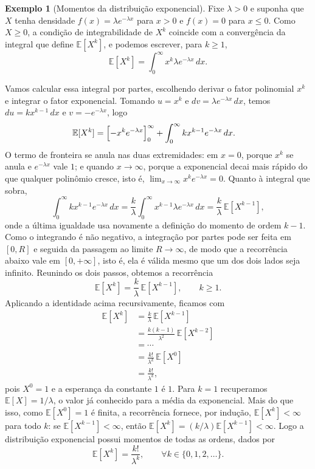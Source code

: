 \documentclass[12pt,portuguese]{article}
\theoremstyle{definition}
\newtheorem{example}[example]{Exemplo}
\theoremstyle{plainexercise}
\theoremstyle{starredexercise}
\theoremstyle{definition}
\begin{document}
\begin{example}[Momentos da distribuição exponencial]\label{ex:momento-exponencial}
Fixe $\lambda>0$ e suponha que $X$ tenha densidade
$f(x)=\lambda e^{-\lambda x}$ para $x>0$ e $f(x)=0$ para $x\leqslant 0$. Como
$X\geqslant 0$, a condição de integrabilidade de $X^k$ coincide com a convergência da
integral que define $\mathbb{E}[X^k]$, e podemos escrever, para $k\geqslant 1$,
\[
\mathbb{E}[X^k]=\int_0^{\infty}x^k\lambda e^{-\lambda x}\,dx .
\]

Vamos calcular essa integral por partes, escolhendo derivar o fator polinomial
$x^k$ e integrar o fator exponencial. Tomando $u=x^k$ e
$dv=\lambda e^{-\lambda x}\,dx$, temos $du=kx^{k-1}\,dx$ e
$v=-e^{-\lambda x}$, logo
\begin{align*}
\mathbb{E}[X^k]
&= \Bigl[-x^k e^{-\lambda x}\Bigr]_0^{\infty}
+ \int_0^{\infty}kx^{k-1}e^{-\lambda x}\,dx .
\end{align*}
O termo de fronteira se anula nas duas extremidades: em $x=0$, porque $x^k$ se
anula e $e^{-\lambda x}$ vale $1$; e quando $x\to\infty$, porque a exponencial decai
mais rápido do que qualquer polinômio cresce, isto é,
$\lim_{x\to\infty}x^k e^{-\lambda x}=0$. Quanto à integral que sobra,
\[
\int_0^{\infty}kx^{k-1}e^{-\lambda x}\,dx
= \frac{k}{\lambda}\int_0^{\infty}x^{k-1}\lambda e^{-\lambda x}\,dx
= \frac{k}{\lambda}\,\mathbb{E}[X^{k-1}],
\]
onde a última igualdade usa novamente a definição do momento de ordem $k-1$.
Como o integrando é não negativo, a integração por partes pode ser feita em
$[0,R]$ e seguida da passagem ao limite $R\to\infty$, de modo que a recorrência
abaixo vale em $[0,+\infty]$, isto é, ela é válida mesmo que um dos dois lados
seja infinito. Reunindo os dois passos, obtemos a recorrência
\[
\mathbb{E}[X^k]=\frac{k}{\lambda}\,\mathbb{E}[X^{k-1}],\qquad k\geqslant 1 .
\]
Aplicando a identidade acima recursivamente, ficamos com
\begin{align*}
\mathbb{E}[X^k]
&= \frac{k}{\lambda}\,\mathbb{E}[X^{k-1}] \\
&= \frac{k(k-1)}{\lambda^2}\,\mathbb{E}[X^{k-2}] \\
&= \cdots \\
&= \frac{k!}{\lambda^k}\,\mathbb{E}[X^0] \\
&= \frac{k!}{\lambda^k},
\end{align*}
pois $X^0=1$ e a esperança da constante $1$ é $1$. Para $k=1$ recuperamos
$\mathbb{E}[X]=1/\lambda$, o valor já conhecido para a média da exponencial.
Mais do que isso, como $\mathbb{E}[X^0]=1$ é finita, a recorrência fornece,
por indução, $\mathbb{E}[X^k]<\infty$ para todo $k$: se
$\mathbb{E}[X^{k-1}]<\infty$, então
$\mathbb{E}[X^k]=(k/\lambda)\mathbb{E}[X^{k-1}]<\infty$. Logo a distribuição
exponencial possui momentos de todas as ordens,
dados por 
\[
\mathbb{E}[X^k]=\frac{k!}{\lambda^k},\qquad \forall k\in \{0,1,2,\ldots\}.
\]
\end{example}
\end{document}

